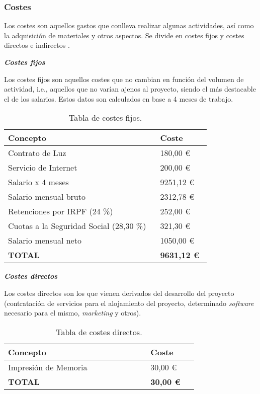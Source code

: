 \subsubsection{Costes}

Los costes son aquellos gastos que conlleva realizar algunas actividades, así como la adquisición de materiales y otros aspectos. Se divide en costes fijos y costes directos e indirectos \cite{costes}.

\textbf{\textit{Costes fijos}}

Los costes fijos son aquellos costes que no cambian en función del volumen de actividad, i.e., aquellos que no varían ajenos al proyecto, siendo el más destacable el de los salarios. Estos datos son calculados en base a 4 meses de trabajo.

\begin{table}[H]
	\centering
	\begin{tabular}{>{\raggedright}b{0.6\linewidth}>{\raggedleft\arraybackslash}b{0.2\linewidth}}
		\toprule
		\textbf{{Concepto}}  & \textbf{{Coste}} \\
		\midrule
		\small{\; Contrato de Luz} & \small{180,00 €} \\		
		\midrule
		\small{\; Servicio de Internet} & \small{200,00 €} \\		
		\midrule
		\small{\; Salario x 4 meses} & \small{9251,12 €} \\
		\cline{2-2}
		\scriptsize{\qquad Salario mensual bruto} & \scriptsize{2312,78 €} \\
		\scriptsize{\qquad Retenciones por IRPF (24 \%)} & \scriptsize{252,00 €} \\
		\scriptsize{\qquad Cuotas a la Seguridad Social (28,30 \%)} & \scriptsize{321,30 €} \\
		\scriptsize{\qquad Salario mensual neto} & \scriptsize{1050,00 €} \\
		\bottomrule
		\textbf{{\scriptsize TOTAL}}  & \textbf{\small 9631,12 €} \\
		\bottomrule
	\end{tabular}
	\caption{Tabla de costes fijos.}
\end{table}

\textbf{\textit{Costes directos}}

Los costes directos son los que vienen derivados del desarrollo del proyecto (contratación de servicios para el alojamiento del proyecto, determinado \textit{software} necesario para el mismo, \textit{marketing} y otros).

\begin{table}[H]
	\centering
	\begin{tabular}{>{\raggedright}b{0.6\linewidth}>{\raggedleft\arraybackslash}b{0.2\linewidth}}
		\toprule
		\textbf{{Concepto}}  & \textbf{{Coste}} \\
		\midrule
		\small{\scriptsize Impresión de Memoria} & \small{30,00 €} \\
		\bottomrule
		\textbf{{\scriptsize TOTAL}}  & \textbf{\small 30,00 €} \\
		\bottomrule
	\end{tabular}
	\caption{Tabla de costes directos.}
\end{table}

